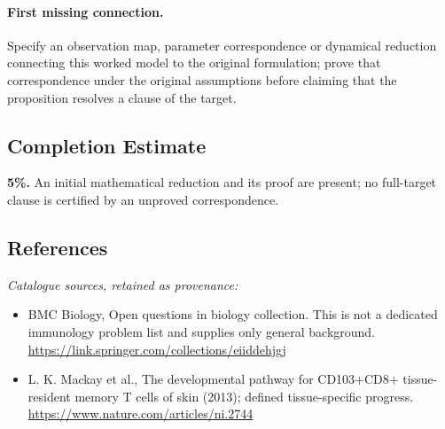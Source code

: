 \documentclass[11pt]{article}
\begin{document}
\paragraph{First missing connection.} Specify an observation map, parameter correspondence or dynamical reduction connecting this worked model to the original formulation; prove that correspondence under the original assumptions before claiming that the proposition resolves a clause of the target.
\subsection{Completion Estimate}
\textbf{5\%.} An initial mathematical reduction and its proof are present; no full-target clause is certified by an unproved correspondence.
\subsection{References}
\noindent\emph{Catalogue sources, retained as provenance:}
\begin{itemize}
\item BMC Biology, Open questions in biology collection. This is not a dedicated immunology problem list and supplies only general background. \url{https://link.springer.com/collections/eiiddehjgj}
\item L. K. Mackay et al., The developmental pathway for CD103+CD8+ tissue-resident memory T cells of skin (2013); defined tissue-specific progress. \url{https://www.nature.com/articles/ni.2744}
\end{itemize}
\clearpage


\appendix
\end{document}
